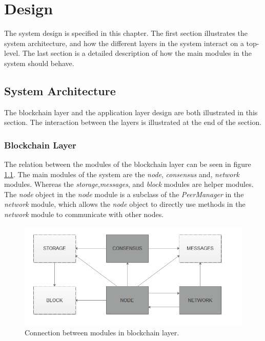 \chapter{Design}
The system design is specified in this chapter. The first section illustrates the system architecture, and how the different layers in the system interact on a top-level. The last section is a detailed description of how the main modules in the system should behave.

\section{System Architecture}
The blockchain layer and the application layer design are both illustrated in this section. The interaction between the layers is illustrated at the end of the section.
\subsection{Blockchain Layer}
The relation between the modules of the blockchain layer can be seen in figure \ref{fig:blockchain}. The main modules of the system are the \textit{node}, \textit{consensus} and, \textit{network} modules. Whereas the \textit{storage},\textit{messages}, and \textit{block} modules are helper modules. The \textit{node} object in the \textit{node} module is a subclass of the \textit{PeerManager} in the \textit{network} module, which allows the \textit{node} object to directly use methods in the \textit{network} module to communicate with other nodes. 

\begin{figure}[!htb]
\centering
	\includegraphics[width=1\textwidth]{Images/blockchain_layer}
	\caption{Connection between modules in blockchain layer.}
	\label{fig:blockchain}
\end{figure}

